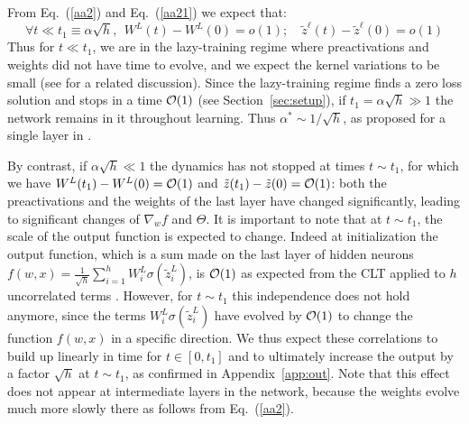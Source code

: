 \documentclass{article}
\newcommand{\be}{\begin{equation}}
\newcommand{\ee}{\end{equation}}
\renewcommand{\cite}[1]{\citep{#1}}
\newcommand{\eref}[1]{Eq.~(\ref{#1})}
\newcommand{\aref}[1]{Appendix~\ref{#1}}
\newcommand{\sref}[1]{Section~\ref{#1}}
\begin{document}
From \eref{aa2} and \eref{aa21} we expect that:
\be
\label{aa3}
\forall t \ll t_1 \equiv \alpha \sqrt{h}, \ \ W^L(t)-W^L(0)=o(1); \quad  \tilde{z}^\ell(t)-\tilde{z}^\ell(0)=o(1)
\ee
Thus for $t \ll t_1$, we are in the lazy-training regime where preactivations and weights did not have time to evolve, and we expect the kernel variations to be small
(see \cite{mei2019mean} for a related discussion). Since the lazy-training regime finds a zero loss solution and stops in a time ${\cal O}(1)$ (see \sref{sec:setup}),  if $t_1 = \alpha \sqrt{h} \gg 1$ the network remains in it throughout learning. 
Thus $\alpha^*\sim 1/\sqrt{h}$, as proposed for a single layer in \cite{chizat19}.



By contrast, if $\alpha \sqrt{h} \ll 1$ the dynamics has not stopped at  times $t \sim t_1$, for which  we have  $W^L(t_1)-W^L(0)={\cal O}(1)$ and $\tilde z(t_1)-\tilde z(0)={\cal O}(1)$: both the preactivations and the weights of the last layer  have changed significantly, leading to significant changes of $\nabla_w f$ and  $\Theta$. It is important to note that at $t\sim t_1$, the scale of the output function is expected to change.
Indeed at initialization the output  function, which is a sum made on the last layer of hidden neurons $f(w,x)= \frac{1}{\sqrt{h}} \sum_{i=1}^h W^L_i \sigma(\tilde z^L_i)$,  is ${\cal O}(1)$
as expected from the CLT applied to $h$ uncorrelated terms \cite{Neal1996}. However, for $t\sim t_1$ this independence does not hold anymore, since  the terms  $W^L_i \sigma(\tilde z^L_i)$ have evolved by ${\cal O}(1)$ to change the function $f(w,x)$ in a specific direction. We thus expect these correlations to build up linearly in time for $t\in[0,t_1]$ and to ultimately increase the output by a factor $\sqrt{h}$ at $t\sim t_1$, as confirmed in \aref{app:out}. Note that this effect does not appear at intermediate layers in the network, because the weights evolve much more slowly there as follows from \eref{aa2}.
\end{document}
